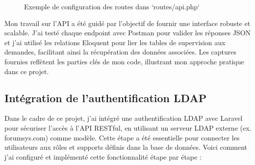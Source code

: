 \begin{itemize}
      \begin{figure}[h]
          \centering
          \caption{Exemple de configuration des routes dans `routes/api.php`}
          \label{fig:routes_api}
      \end{figure}
\end{itemize}

Mon travail sur l’API a été guidé par l’objectif de fournir une interface robuste et scalable. J’ai testé chaque endpoint avec Postman pour valider les réponses JSON et j’ai utilisé les relations Eloquent pour lier les tables de supervision aux demandes, facilitant ainsi la récupération des données associées. Les captures fournies reflètent les parties clés de mon code, illustrant mon approche pratique dans ce projet.

\subsection{Intégration de l’authentification LDAP}

Dans le cadre de ce projet, j’ai intégré une authentification LDAP avec Laravel pour sécuriser l’accès à l’API RESTful, en utilisant un serveur LDAP externe (ex. forumsys.com) comme modèle. Cette étape a été essentielle pour connecter les utilisateurs aux rôles et supports définis dans la base de données. Voici comment j’ai configuré et implémenté cette fonctionnalité étape par étape :

